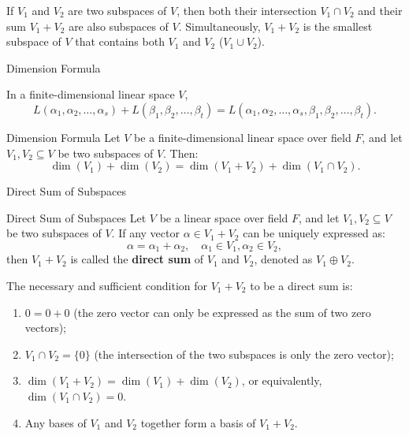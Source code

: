 \documentclass[11pt]{../../TexTemplate/elegantbook} %
\begin{document}
If \( V_1 \) and \( V_2 \) are two subspaces of \( V \), 
then both their intersection \( V_1 \cap V_2 \) and their sum \( V_1 + V_2 \) are also subspaces of \( V \).
Simultaneously, \( V_{1}+V_{2} \) is the smallest subspace of \( V \) 
that contains both \( V_1 \) and \( V_2 \) (\(V_{1}\cup V_{2}\)).

\begin{leftbarTitle}{Dimension Formula}\end{leftbarTitle}
\begin{proposition}
    In a finite-dimensional linear space \( V \),
    \[
    L(\alpha_1, \alpha_2, \dots, \alpha_s) + L(\beta_1, \beta_2, \dots, \beta_t) = 
    L(\alpha_1, \alpha_2, \dots, \alpha_s, \beta_1, \beta_2, \dots, \beta_t).
    \]
\end{proposition}

\begin{theorem}{Dimension Formula}\label{thm:dimension_formula}
    Let \( V \) be a finite-dimensional linear space over field \( F \), 
    and let \( V_1, V_2 \subseteq V \) be two subspaces of \( V \). Then:
    \[
    \dim(V_1) + \dim(V_2) = \dim(V_1 + V_2) + \dim(V_1 \cap V_2).
    \]
    
\end{theorem}

\begin{leftbarTitle}{Direct Sum of Subspaces}\end{leftbarTitle}
\begin{definition}{Direct Sum of Subspaces}
    Let \( V \) be a linear space over field \( F \), 
    and let \( V_1, V_2 \subseteq V \) be two subspaces of \( V \).
    If any vector \( \alpha \in V_1 + V_2 \) can be uniquely expressed as:
    \[
    \alpha = \alpha_1 + \alpha_2, \quad \alpha_1 \in V_1, \alpha_2 \in V_2,
    \]
    then \( V_1 + V_2 \) is called the \textbf{direct sum} of \( V_1 \) and \( V_2 \),
    denoted as \( V_1 \oplus V_2 \).
\end{definition}

\begin{proposition}
    The necessary and sufficient condition for \( V_1 + V_2 \) to be a direct sum is:
    \begin{enumerate}
        \item \(0 = 0 + 0\) (the zero vector can only be expressed as the sum of two zero vectors); 
        \item \( V_1 \cap V_2 = \{0\} \) (the intersection of the two subspaces is only the zero vector);
        \item \(\operatorname{dim}(V_{1}+V_{2})=\operatorname{dim}(V_{1})+\operatorname{dim}(V_{2})\),
            or equivalently, \(\operatorname{dim}(V_{1} \cap V_{2})=0\).
        \item Any bases of \( V_1 \) and \( V_2 \) together form a basis of \( V_1 + V_2 \).
    \end{enumerate}
\end{proposition}
\end{document}
